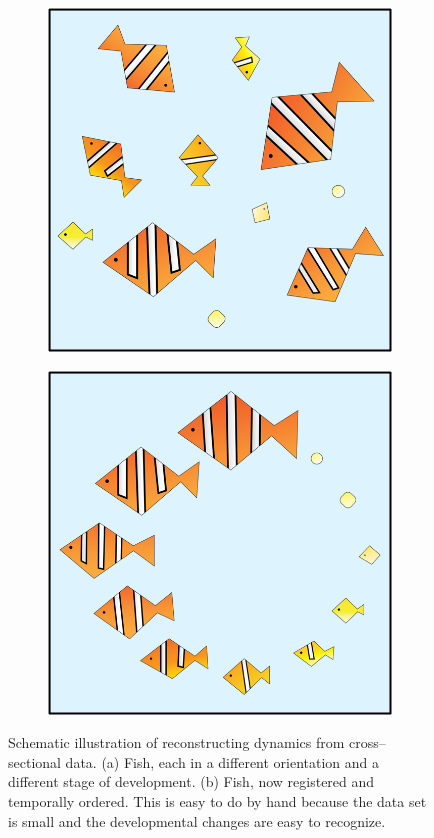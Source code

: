 \documentclass{pnastwo}
\begin{document}
\begin{figure}
\begin{subfigure}{0.25\textwidth}
\includegraphics[width=\textwidth]{fish1}
\caption{}
\end{subfigure}
\begin{subfigure}{0.25\textwidth}
\includegraphics[width=\textwidth]{fish2}
\caption{}
\end{subfigure}
\caption{Schematic illustration of reconstructing dynamics from cross--sectional data. (a) Fish, each in a different orientation and a different stage of development. (b) Fish, now registered and temporally ordered. This is easy to do by hand because the data set is small and the developmental changes are easy to recognize.} 
\label{fig:fish}
\end{figure}
\end{document}

